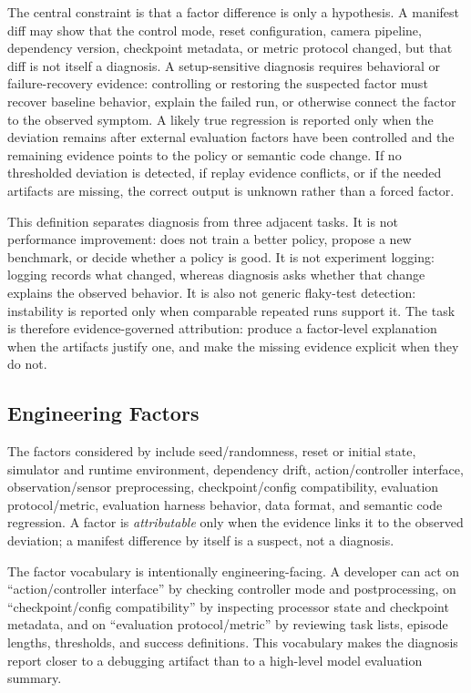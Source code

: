 The central constraint is that a factor difference is only a hypothesis. A
manifest diff may show that the control mode, reset configuration, camera
pipeline, dependency version, checkpoint metadata, or metric protocol
changed, but that diff is not itself a diagnosis. A setup-sensitive
diagnosis requires behavioral or failure-recovery evidence: controlling or
restoring the suspected factor must recover baseline behavior, explain the
failed run, or otherwise connect the factor to the observed symptom. A
likely true regression is reported only when the deviation remains after external
evaluation factors have been controlled and the remaining evidence points
to the policy or semantic code change. If no thresholded deviation is
detected, if replay evidence conflicts, or if the needed artifacts are
missing, the correct output is unknown rather than a forced factor.

This definition separates diagnosis from three adjacent tasks. It is not
performance improvement: \sys does not train a better policy, propose a new
benchmark, or decide whether a policy is good. It is not experiment logging:
logging records what changed, whereas diagnosis asks whether that change
explains the observed behavior. It is also not generic flaky-test detection:
instability is reported only when comparable repeated runs support it.
The task is therefore evidence-governed attribution: produce a factor-level
explanation when the artifacts justify one, and make the missing evidence
explicit when they do not.

\subsection{Engineering Factors}

The factors considered by \sys include seed/randomness, reset or initial state, simulator and runtime environment, dependency drift, action/controller interface, observation/sensor preprocessing, checkpoint/config compatibility, evaluation protocol/metric, evaluation harness behavior, data format, and semantic code regression. A factor is \emph{attributable} only when the evidence links it to the observed deviation; a manifest difference by itself is a suspect, not a diagnosis.

The factor vocabulary is intentionally engineering-facing. A developer can act on ``action/controller interface'' by checking controller mode and postprocessing, on ``checkpoint/config compatibility'' by inspecting processor state and checkpoint metadata, and on ``evaluation protocol/metric'' by reviewing task lists, episode lengths, thresholds, and success definitions. This vocabulary makes the diagnosis report closer to a debugging artifact than to a high-level model evaluation summary.

